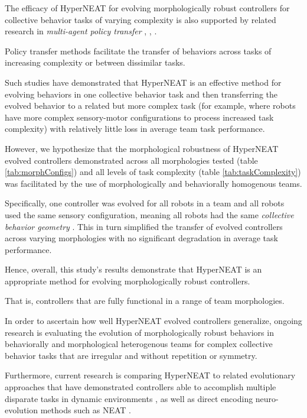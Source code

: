 The efficacy of HyperNEAT for evolving morphologically robust controllers for collective behavior
tasks of varying complexity is also supported by related research in \textit{multi-agent policy transfer}
\cite{verbancsics_evolving_2010}, \cite{DidiNitschke2016SSCI}, \cite{DidiNitschke2016}.

Policy transfer methods facilitate the transfer of behaviors across tasks of increasing
complexity or between dissimilar tasks.  

Such studies have demonstrated that HyperNEAT is an effective
method for evolving behaviors in one collective behavior task and then transferring the evolved behavior
to a related but more complex task (for example, where robots have more complex sensory-motor configurations
to process increased task complexity) with relatively little loss in average team task performance.

However, we hypothesize that the morphological robustness of HyperNEAT evolved controllers demonstrated across all
morphologies tested (table \ref{tab:morphConfigs}) and all levels of task complexity
(table \ref{tab:taskComplexity}) was facilitated by the use of morphologically and behaviorally homogenous teams.

Specifically, one controller was evolved for all robots in a team and all robots used the same sensory configuration, meaning
all robots had the same \textit{collective behavior geometry} \cite{DAmbrosioLehmanStanley2010}.
This in turn simplified the transfer of evolved controllers across varying morphologies with no significant degradation
in average task performance.

Hence, overall, this study's results demonstrate that HyperNEAT is an appropriate method for evolving
morphologically robust controllers.  

That is, controllers that are fully functional in a range of team morphologies.

In order to ascertain how well HyperNEAT evolved controllers generalize, ongoing research is evaluating
the evolution of morphologically robust behaviors in behaviorally and morphological heterogenous teams
for complex collective behavior tasks that are irregular and without repetition or symmetry.

Furthermore, current research is comparing HyperNEAT to related evolutionary approaches that have demonstrated
controllers able to accomplish multiple disparate tasks in dynamic environments
\cite{IzquierdoTorres2008}, as well as direct encoding neuro-evolution methods such as NEAT \cite{StanleyMiikkulainen2002}.

